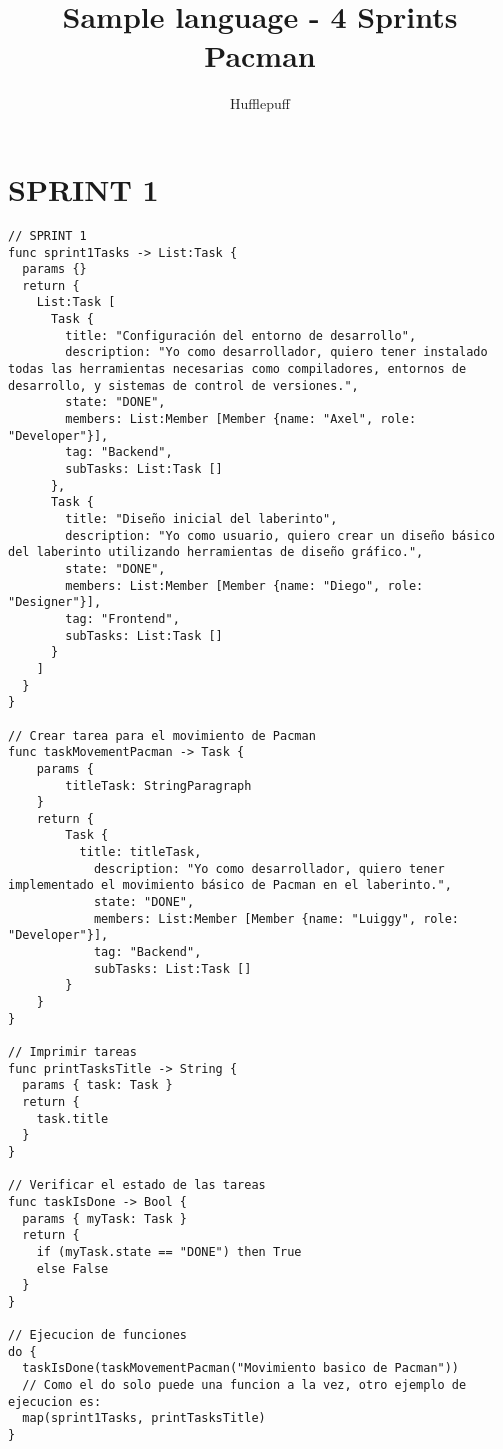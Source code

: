 \documentclass{article}
\title{Sample language - 4 Sprints Pacman}
\author{Hufflepuff}
\begin{document}
\maketitle

\section{SPRINT 1}
\begin{verbatim}
// SPRINT 1
func sprint1Tasks -> List:Task {
  params {}
  return {
    List:Task [
      Task {
        title: "Configuración del entorno de desarrollo",
        description: "Yo como desarrollador, quiero tener instalado todas las herramientas necesarias como compiladores, entornos de desarrollo, y sistemas de control de versiones.",
        state: "DONE",
        members: List:Member [Member {name: "Axel", role: "Developer"}],
        tag: "Backend",
        subTasks: List:Task []
      },
      Task {
        title: "Diseño inicial del laberinto",
        description: "Yo como usuario, quiero crear un diseño básico del laberinto utilizando herramientas de diseño gráfico.",
        state: "DONE",
        members: List:Member [Member {name: "Diego", role: "Designer"}],
        tag: "Frontend",
        subTasks: List:Task []
      }
    ]
  }
}

// Crear tarea para el movimiento de Pacman
func taskMovementPacman -> Task {
    params {
        titleTask: StringParagraph
    }
    return {
        Task {
          title: titleTask,
	        description: "Yo como desarrollador, quiero tener implementado el movimiento básico de Pacman en el laberinto.",
	        state: "DONE",
	        members: List:Member [Member {name: "Luiggy", role: "Developer"}],
	        tag: "Backend",
	        subTasks: List:Task []
        }
    }
}

// Imprimir tareas
func printTasksTitle -> String {
  params { task: Task }
  return {
    task.title
  }
}

// Verificar el estado de las tareas
func taskIsDone -> Bool {
  params { myTask: Task }
  return {
    if (myTask.state == "DONE") then True
    else False
  }
}

// Ejecucion de funciones 
do {
  taskIsDone(taskMovementPacman("Movimiento basico de Pacman"))
  // Como el do solo puede una funcion a la vez, otro ejemplo de ejecucion es:
  map(sprint1Tasks, printTasksTitle)
}
\end{verbatim}
\end{document}
